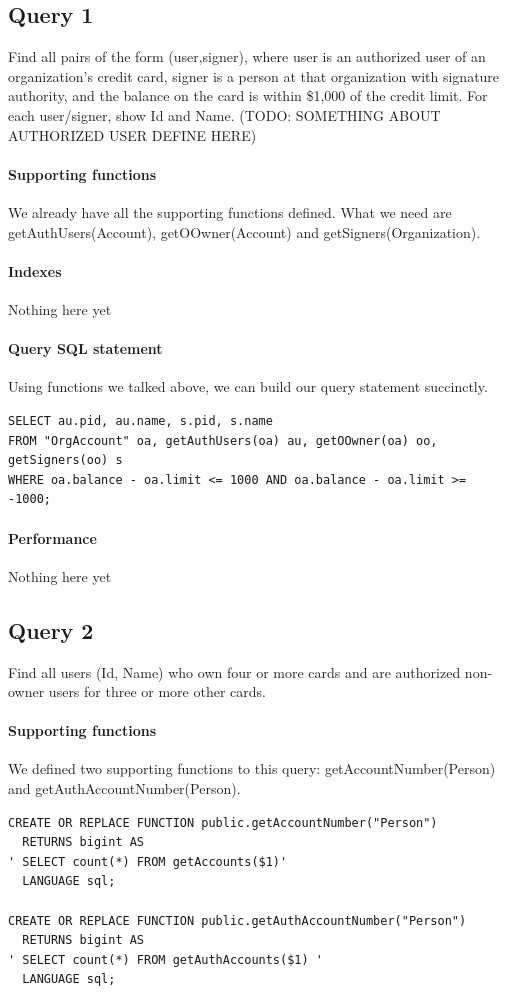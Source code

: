 \documentclass[11pt]{article}
\begin{document}
\subsection{Query 1}
Find all pairs of the form (user,signer), where user is an authorized user of an organization's credit card, signer is a person at that organization with signature authority, and the balance on the card is within \$1,000 of the credit limit. For each user/signer, show Id and Name. (TODO: SOMETHING ABOUT AUTHORIZED USER DEFINE HERE)

\paragraph{Supporting functions} We already have all the supporting functions defined. What we need are getAuthUsers(Account), getOOwner(Account) and getSigners(Organization).

\paragraph{Indexes} Nothing here yet

\paragraph{Query SQL statement} Using functions we talked above, we can build our query statement succinctly.
\begin{verbatim}
SELECT au.pid, au.name, s.pid, s.name
FROM "OrgAccount" oa, getAuthUsers(oa) au, getOOwner(oa) oo, getSigners(oo) s
WHERE oa.balance - oa.limit <= 1000 AND oa.balance - oa.limit >= -1000;
\end{verbatim}

\paragraph{Performance} Nothing here yet

\subsection{Query 2}
Find all users (Id, Name) who own four or more cards and are authorized non-owner users for three or more other cards.

\paragraph{Supporting functions} We defined two supporting functions to this query: getAccountNumber(Person) and getAuthAccountNumber(Person).
\begin{verbatim}
CREATE OR REPLACE FUNCTION public.getAccountNumber("Person")
  RETURNS bigint AS
' SELECT count(*) FROM getAccounts($1)'
  LANGUAGE sql;

CREATE OR REPLACE FUNCTION public.getAuthAccountNumber("Person")
  RETURNS bigint AS
' SELECT count(*) FROM getAuthAccounts($1) '
  LANGUAGE sql;
\end{verbatim}
\end{document}
